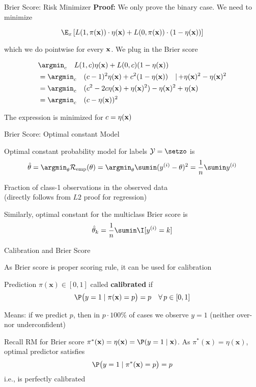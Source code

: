 \documentclass[11pt,compress,t,notes=noshow, xcolor=table]{beamer}
\begin{document}
\begin{frame}{Brier Score: Risk Minimizer}
\textbf{Proof: } We only prove the binary case. We need to minimize 

$$
\E_x \left[L(1, \pix) \cdot \eta(\xv) + L(0, \pix) \cdot (1 - \eta(\xv)) \right]
$$

which we do pointwise for every $\mathbf{x}$. We plug in the Brier score

\vspace*{-0.3cm}

\begin{align*}
	& \argmin_c \quad L(1, c) \eta(\xv) + L(0, c) (1 - \eta(\xv)) \\ 
	&=  \argmin_c \quad (c - 1)^2 \eta(\xv) + c^2 (1 - \eta(\xv))  \quad |{\,+\eta(\xv)^2-\eta(\xv)^2}\\
  &=  \argmin_c \quad (c^2 -2c\eta(\xv) + \eta(\xv)^2)- \eta(\xv)^2 + \eta(\xv) \\
	&=  \argmin_c \quad (c - \eta(\xv))^2
\end{align*}

The expression is minimized for $c = \eta(\mathbf{x})$

\end{frame}

\begin{framei}[sep=L]{Brier Score: Optimal constant Model}

    \item Optimal constant probability model for labels $\Yspace = \setzo$ is 
    $$\thetah=\argmin_{\theta} \riske(\theta) = \argmin_{\theta} \sumin (\yi - \theta)^2 = \frac{1}{n} \sumin \yi$$
    \item Fraction of class-1 observations in the observed data\\ (directly follows from $L2$ proof for regression)
    \item Similarly, optimal constant for the multiclass Brier score is $$\thetah_k = \frac{1}{n}\sumin \I [\yi = k]$$

\end{framei}

\begin{framei}[sep=L]{Calibration and Brier Score}

    \item As Brier score is proper scoring rule, it can be used for calibration
    \item Prediction $\pi(\mathbf{x})\in[0,1]$ called \textbf{calibrated} if 
$$\P\bigl(y=1 \mid \pi(\mathbf{x})=p\bigr)=p \quad \forall\, p\in[0,1]$$
    \item Means: if we predict $p$, then in $p \cdot 100\%$ of cases we observe $y=1$ (neither over- nor underconfident)
    \item Recall RM for Brier score $\pi^*(\mathbf{x}) = \eta(\mathbf{x}) = \P(y=1 \mid \mathbf{x})$. As \(\pi^*(\mathbf{x})=\eta(\mathbf{x})\), optimal predictor satisfies $$\P\bigl(y=1 \mid \pi^*(\mathbf{x})=p\bigr)=p$$
i.e., is perfectly calibrated


\end{framei}
\end{document}
